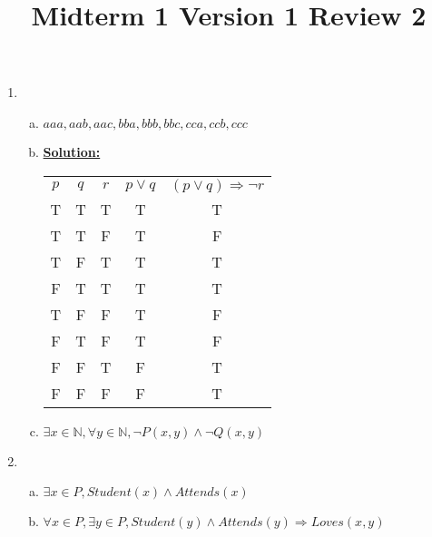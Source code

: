 \documentclass[12pt]{article}
\begin{document}
\title{Midterm 1 Version 1 Review 2}
\maketitle

\begin{enumerate}[1.]
    \item

    \begin{enumerate}[a)]
        \item ${aaa,aab,aac,bba,bbb,bbc,cca,ccb,ccc}$
        \item

        \underline{\textbf{Solution:}}

        \begin{tabular}{|c|c|c|c|c|}
            \hline
            $p$ & $q$ & $r$ & $p \lor q$ & $(p \lor q) \Rightarrow \neg r$\\
            T & T & T & T & T \\
            \hline
            T & T & F & T & F \\
            \hline
            T & F & T & T & T \\
            \hline
            F & T & T & T & T \\
            \hline
            T & F & F & T & F \\
            \hline
            F & T & F & T & F \\
            \hline
            F & F & T & F & T \\
            \hline
            F & F & F & F & T \\
            \hline
        \end{tabular}

        \item

        $\exists x \in \mathbb{N}, \forall y \in \mathbb{N}, \neg P(x,y) \land \neg Q(x,y)$

    \end{enumerate}

    \item

    \begin{enumerate}[a)]
        \item $\exists x \in P, Student(x) \land Attends(x)$
        \item $\forall x \in P, \exists y \in P, Student(y) \land Attends(y) \Rightarrow Loves(x,y)$
    \end{enumerate}
\end{enumerate}
\end{document}
